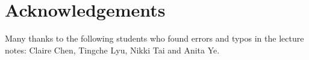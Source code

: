 \chapter*{Acknowledgements}%
\label{cha:acknowledgements}

Many thanks to the following students who found errors and typos in the lecture notes:
Claire Chen, Tingche Lyu, Nikki Tai and Anita Ye.

